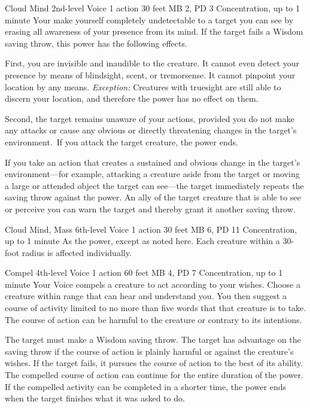 \DndPowerHeader%
    {Cloud Mind\label{pwr:cloud_mind}}
    {2nd-level Voice}
    {1 action}
    {30 feet}
    {MB 2, PD 3}
    {Concentration, up to 1 minute}
Your make yourself completely undetectable
to a target you can see by erasing all awareness of your presence
from its mind. If the target fails a Wisdom saving throw,
this power has the following effects.

First, you are invisible and inaudible to the creature. It
cannot even detect your presence by means of blindsight, scent,
or tremorsense. It cannot pinpoint your location by any means.
\textit{Exception:} Creatures with truesight are still able
to discern your location, and therefore the power has no effect
on them.

Second, the target remains unaware of your actions, provided
you do not make any attacks or cause any obvious or directly
threatening changes in the target's environment.\ If you
attack the target creature, the power ends.

If you take an action that creates a sustained and obvious
change in the target's environment---for example, attacking
a creature aside from the target or moving a large or attended
object the target can see---the target immediately repeats
the saving throw against the power. An ally of the target
creature that is able to see or perceive you can warn the
target and thereby grant it another saving throw.

\DndPowerHeader%
    {Cloud Mind, Mass\label{pwr:cloud_mind_mass}}
    {6th-level Voice}
    {1 action}
    {30 feet}
    {MB 6, PD 11}
    {Concentration, up to 1 minute}
As the  power, except as
noted here. Each creature within a 30-foot radius is affected
individually.

\DndPowerHeader%
    {Compel\label{pwr:compel}}
    {4th-level Voice}
    {1 action}
    {60 feet}
    {MB 4, PD 7}
    {Concentration, up to 1 minute}
Your Voice compels a creature to act according
to your wishes. Choose a creature within range that can hear
and understand you. You then suggest a course of activity
limited to no more than five words that that creature is to
take. The course of action can be harmful to the creature
or contrary to its intentions.

The target must make a Wisdom saving throw. The target has
advantage on the saving throw if the course of action is plainly
harmful or against the creature's wishes. If the target fails,
it pursues the course of action to the best of its ability.
The compelled course of action can continue for the entire
duration of the power. If the compelled activity can be completed
in a shorter time, the power ends when the target finishes
what it was asked to do.

